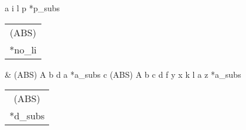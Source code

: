 \documentclass[11pt]{article}
\def\twolines#1#2{\vbox{\hbox{#1} \hbox{#2}}}
\renewcommand{\twolines}[2]{\begin{tabular}{c} #1\\{} #2\end{tabular}}
\begin{document}
\mpxshipout%
a
\stopmpxshipout
\mpxshipout%
i
\stopmpxshipout
\mpxshipout%
l
\stopmpxshipout
\mpxshipout%
p
\stopmpxshipout
\mpxshipout%
*p\_subs
\stopmpxshipout
\mpxshipout%
\twolines{(ABS)}
                                           {*no\_li}%
\stopmpxshipout
{}
\stopmpxshipout
\mpxshipout%
\&
\stopmpxshipout
{}
\stopmpxshipout
{}
\stopmpxshipout
\mpxshipout%
(ABS) A
\stopmpxshipout
\mpxshipout%
b
\stopmpxshipout
\mpxshipout%
d
\stopmpxshipout
\mpxshipout%
a
\stopmpxshipout
\mpxshipout%
*a\_subs
\stopmpxshipout
\mpxshipout%
c
\stopmpxshipout
{}
\stopmpxshipout
\mpxshipout%
(ABS) A
\stopmpxshipout
\mpxshipout%
b
\stopmpxshipout
\mpxshipout%
c
\stopmpxshipout
\mpxshipout%
d
\stopmpxshipout
\mpxshipout%
f
\stopmpxshipout
\mpxshipout%
y
\stopmpxshipout
\mpxshipout%
x
\stopmpxshipout
\mpxshipout%
k
\stopmpxshipout
\mpxshipout%
l
\stopmpxshipout
\mpxshipout%
a
\stopmpxshipout
\mpxshipout%
z
\stopmpxshipout
\mpxshipout%
*a\_subs
\stopmpxshipout
\mpxshipout%
\twolines{(ABS)}{*d\_subs}
\stopmpxshipout
{}
\stopmpxshipout
{}
\stopmpxshipout
\end{document}

